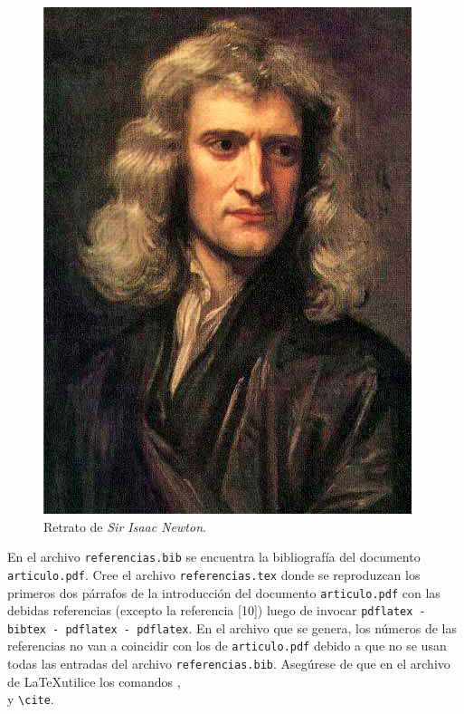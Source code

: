 \documentclass[11pt,letterpaper]{exam}
\begin{document}
\begin{questions}
\begin{mdframed}[style=mystyle]
\begin{figure}[H]
\includegraphics[scale=0.2, angle=100]{isaac}
\caption{Retrato de \textit{Sir Isaac Newton}.}
\label{fig:Isaac}
\end{figure}
\end{mdframed}

 En el archivo \verb"referencias.bib" se encuentra la bibliografía del documento \verb|articulo.pdf|. Cree el archivo \verb+referencias.tex+ donde se reproduzcan los primeros dos p\'arrafos de la introducci\'on del documento \verb|articulo.pdf| con las debidas referencias (excepto la referencia [10]) luego de invocar \verb+pdflatex - bibtex - pdflatex - pdflatex+. En el archivo que se genera, los n\'umeros de las referencias no van a coincidir con los de \verb|articulo.pdf| debido a que no se usan todas las entradas del archivo \verb|referencias.bib|. Aseg\'urese de que en el archivo de \LaTeX \hspace{2pt}utilice los comandos \verb++,\\ \verb++ y \verb+\cite+.

\end{questions}
\end{document}
